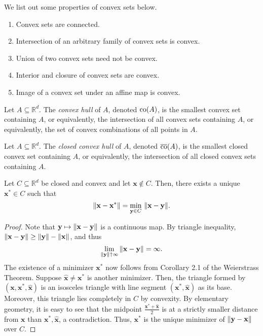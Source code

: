 We list out some properties of convex sets below. 

\begin{enumerate}
    \item Convex sets are connected.
    \item Intersection of an arbitrary family of convex sets is convex.
    \item Union of two convex sets need not be convex.
    \item Interior and closure of convex sets are convex.
    \item Image of a convex set under an affine map is convex.
\end{enumerate}

\begin{defn}
    Let $A \subseteq \mathbb{R}^d$. The \emph{convex hull} of $A$, denoted $\operatorname*{co}(A)$, is the smallest convex set containing $A$, or equivalently, the intersection of all convex sets containing $A$, or equivalently, the set of convex combinations of all points in $A$. 
\end{defn}

\begin{defn}
    Let $A \subseteq \mathbb{R}^d$. The \emph{closed convex hull} of $A$, denoted $\operatorname*{\overline{co}}(A)$, is the smallest closed convex set containing $A$, or equivalently, the intersection of all closed convex sets containing $A$.
\end{defn}

\begin{thm}
    Let $C \subseteq \mathbb{R}^d$ be closed and convex and let $\mathbf{x} \notin C$. Then, there exists a unique $\mathbf{x}^* \in C$ such that
    \[
        \norm{\mathbf{x} - \mathbf{x}^*} = \min_{\mathbf{y} \in C} \, \norm{\mathbf{x} - \mathbf{y}}.
    \]
\end{thm}

\begin{proof}
    Note that $\mathbf{y} \mapsto \norm{\mathbf{x} - \mathbf{y}}$ is a continuous map. By triangle inequality, $\norm{\mathbf{x} - \mathbf{y}} \geq \norm{\mathbf{y}} - \norm{\mathbf{x}}$, and thus
    \[
        \lim_{\norm{\mathbf{y}} \uparrow \infty} \norm{\mathbf{x} - \mathbf{y}} = \infty.
    \]
    The existence of a minimizer $\mathbf{x}^*$ now follows from Corollary 2.1 of the Weierstrass Theorem. Suppose $\hat{\mathbf{x}} \neq \mathbf{x}^*$ is another minimizer. Then, the triangle formed by $(\mathbf{x}, \mathbf{x}^*, \hat{\mathbf{x}})$ is an isosceles triangle with line segment $(\mathbf{x}^*, \hat{\mathbf{x}})$ as its base. Moreover, this triangle lies completely in $C$ by convexity. By elementary geometry, it is easy to see that the midpoint $\frac{\mathbf{x}^* + \hat{\mathbf{x}}}{2}$ is at a strictly smaller distance from $\mathbf{x}$ than $\mathbf{x}^*, \hat{\mathbf{x}}$, a contradiction. Thus, $\mathbf{x}^*$ is the unique minimizer of $\norm{\mathbf{y} - \mathbf{x}}$ over $C$. 
\end{proof}

